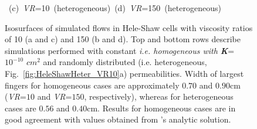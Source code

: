 \begin{figure}[ht]
{\hbox{\hspace{0.25cm} (c) {\it VR}=10 (heterogeneous) \hspace{1.5cm} (d) {\it VR}=150 (heterogeneous) }
}
\caption{Isosurfaces of simulated flows in Hele-Shaw cells with viscosity ratios of 10 (a and c) and 150 (b and d). Top and bottom rows describe simulations performed with constant \textit{i.e. homogeneous with \textbf{K}}= $10^{-10}$ \textit{${cm}^{2}$} and randomly distributed (i.e. heterogeneous, Fig.~\ref{fig:HeleShawHeter_VR10}a) permeabilities. Width of largest fingers for homogeneous cases are approximately $0.70$ and $0.90$cm (\textit{VR}=$10$ and \textit{VR}=$150$, respectively), whereas for heterogeneous cases are $0.56$ and $0.40$cm. Results for homogeneous cases are in good agreement with values obtained from \citet{guan_2003}'s analytic solution.}
\label{fig:homoheleshaw_VN10_VN150}
\end{figure}
\clearpage



